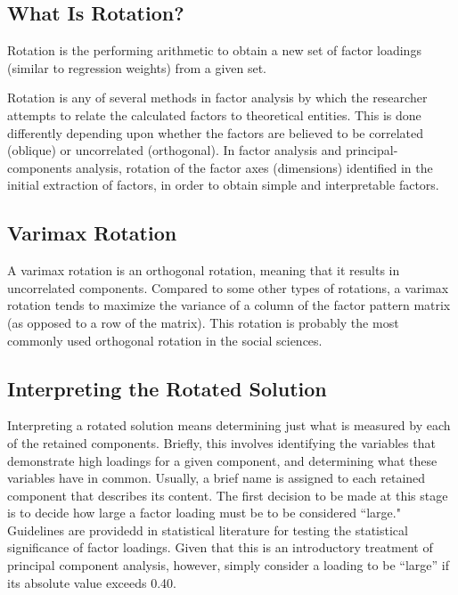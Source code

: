 \subsection{What Is Rotation?}
Rotation is the performing arithmetic to obtain a new set of factor loadings (similar to regression weights) from a given set.

Rotation is any of several methods in factor analysis by which the researcher attempts to relate the calculated factors to theoretical entities. This is done differently depending upon whether the factors are believed to be correlated (oblique) or uncorrelated
(orthogonal). In factor analysis and principal-components analysis, rotation of the factor axes
(dimensions) identified in the initial extraction of factors, in order to obtain simple and interpretable
factors.
\subsection{Varimax Rotation}
A varimax rotation is an orthogonal rotation, meaning that
it results in uncorrelated components. Compared to some other types of rotations, a varimax
rotation tends to maximize the variance of a column of the factor pattern matrix (as opposed to a
row of the matrix). This rotation is probably the most commonly used orthogonal rotation in the
social sciences.

\subsection{Interpreting the Rotated Solution}

Interpreting a rotated solution means determining just what is measured by each of the retained
components. Briefly, this involves identifying the variables that demonstrate high loadings for a
given component, and determining what these variables have in common. Usually, a brief name
is assigned to each retained component that describes its content.
The first decision to be made at this stage is to decide how large a factor loading must be to be
considered ``large."
Guidelines are providedd in statistical literature for testing the statistical significance of factor loadings. Given that this
is an introductory treatment of principal component analysis, however, simply consider a loading
to be “large” if its absolute value exceeds 0.40.

